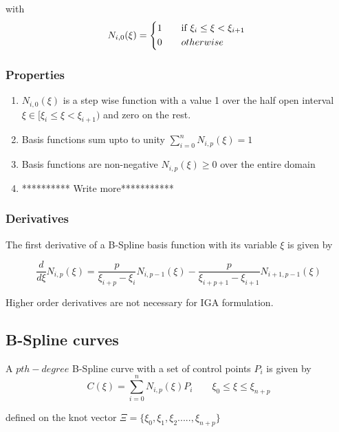\documentclass[12pt]{article}
\begin{document}
\noindent
with
\begin{equation}
 N_{i,0}(\xi) = 
\begin{cases*}
1 \quad& if $  \xi_{i} \leq \xi<\xi_{i+1} $ \\
0 &  $ otherwise $ \\
\end{cases*}
\end{equation}

\subsubsection{Properties }
\begin{enumerate}
\item $ N_{i,0}(\xi)$ is a step wise function with a value 1 over the half open interval $ \xi \in [\xi_{i}  \leq \xi<\xi_{i+1}) $ and zero on the rest.
\item Basis functions sum upto to unity $\sum_{i=0}^{n} N_{i,p}(\xi) =1$
\item Basis functions are non-negative $ N_{i,p}(\xi) \geq 0$ over the entire
 domain
\item********** Write more*********** 
\end{enumerate}

\subsubsection{Derivatives }
The first derivative of a B-Spline basis function with its variable $\xi$ is given by

\begin{equation}
\frac{d}{d\xi}N_{i,p}(\xi) = \frac{p}{\xi_{i+p}-\xi_{i}} N_{i,p-1}(\xi) -
\frac{p}{\xi_{i+p+1}-\xi_{i+1}} N_{i+1,p-1}(\xi)
\end{equation}

\noindent
Higher order derivatives are not necessary for IGA formulation.

\subsection{B-Spline curves}

A $pth-degree$ B-Spline curve with a set of control points $P_i$ is given by
\begin{equation}
C(\xi) = \sum_{i=0}^{n} N_{i,p}(\xi) P_i \qquad \xi_0 \leq \xi \leq \xi_{n+p}
\end{equation}

\noindent
defined on the knot vector $\Xi = \{ \xi_0,\xi_1,\xi_2.....,\xi_{n+p}\}$
\end{document}
